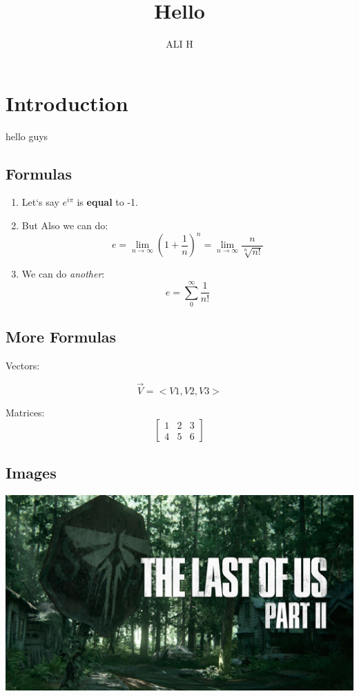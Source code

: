\documentclass[12pt]{article}
\title{Hello}
\author{ALI H}
\date
\begin{document}
\maketitle

\section{Introduction}
hello guys

\subsection{Formulas}
\begin{enumerate}
\item 
Let`s say $e^{i\pi}$ is \textbf{equal} to -1. %
\item 
But Also we can do: 
$$ e = \lim_{n \to \infty } \left ( 1 + \frac{1}{n} \right ) ^n = \lim_{n \to \infty } \frac{n}{\sqrt[n]{n!}}$$
\item
We can do \textit{another}:
$$ e = \sum_{0}^{\infty} \frac{1}{n!}$$
\end{enumerate}

\subsection{More Formulas}
\hspace{0.61cm}Vectors:

$$\vec{V} =<V1, V2, V3>$$

Matrices:
$$
\begin{bmatrix}
    1 & 2 & 3\\
    4 & 5 & 6
\end{bmatrix}
$$

\subsection{Images}

\includegraphics[scale = 0.1]{LOS2.jpg}
\\
\end{document}
